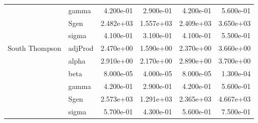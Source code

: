 \documentclass[11pt]{book}
\begin{document}
\begin{longtable}[]{@{}llrrrr@{}}
& gamma & 4.200e-01 & 2.900e-01 & 4.200e-01 & 5.600e-01 \\
& Sgen & 2.482e+03 & 1.557e+03 & 2.409e+03 & 3.650e+03 \\
& sigma & 4.100e-01 & 3.100e-01 & 4.100e-01 & 5.500e-01 \\
South Thompson & adjProd & 2.470e+00 & 1.590e+00 & 2.370e+00 & 3.660e+00 \\
& alpha & 2.910e+00 & 2.170e+00 & 2.890e+00 & 3.700e+00 \\
& beta & 8.000e-05 & 4.000e-05 & 8.000e-05 & 1.300e-04 \\
& gamma & 4.200e-01 & 2.900e-01 & 4.200e-01 & 5.600e-01 \\
& Sgen & 2.573e+03 & 1.291e+03 & 2.365e+03 & 4.667e+03 \\
& sigma & 5.700e-01 & 4.300e-01 & 5.600e-01 & 7.500e-01 \\
\bottomrule
\end{longtable}
\end{document}
